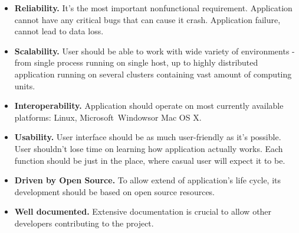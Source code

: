 \begin{itemize}

\item {\bf Reliability.}
It's the most important nonfunctional requirement. Application cannot have any critical bugs that can cause it crash. Application failure, cannot lead to data loss. 

\item {\bf Scalability.}
User should be able to work with wide variety of environments - from single process running on single host, up to highly distributed application running on several clusters containing vast amount of computing units.

\item {\bf Interoperability.}
Application should operate on most currently available platforms: Linux, Microsoft\textregistered~Windows\textregistered or Mac OS X\textregistered.

\item {\bf Usability.}
User interface should be as much user-friendly as it's possible. User shouldn't lose time on learning how application actually works. Each function should be just in the place, where casual user will expect it to be.

\item {\bf Driven by Open Source.}
To allow extend of application's life cycle, its development should be based on open source resources.

\item {\bf Well documented.}
Extensive documentation is crucial to allow other developers contributing to the project.

\end{itemize}
